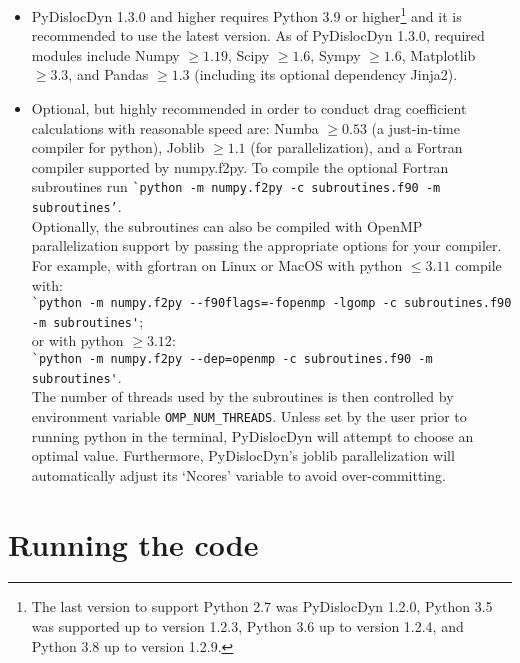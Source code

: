 \documentclass[11pt,letterpaper,oneside,pdftex]{article}
\begin{document}
\begin{itemize}
\item PyDislocDyn 1.3.0 and higher requires Python 3.9 or higher\footnote{
The last version to support Python 2.7 was PyDislocDyn 1.2.0, Python 3.5 was supported up to version 1.2.3, Python 3.6 up to version 1.2.4, and Python 3.8 up to version 1.2.9.}
and it is recommended to use the latest version.
As of PyDislocDyn 1.3.0, required modules include Numpy $\ge1.19$, Scipy $\ge1.6$, Sympy $\ge1.6$, Matplotlib $\ge3.3$, and Pandas $\ge1.3$ (including its optional dependency Jinja2).
\item Optional, but highly recommended in order to conduct drag coefficient calculations with reasonable speed are:
Numba $\ge0.53$ (a just-in-time compiler for python), Joblib $\ge1.1$ (for parallelization), and a Fortran compiler supported by numpy.f2py. To compile the optional Fortran subroutines run \verb|`python -m numpy.f2py -c subroutines.f90 -m subroutines’|.\\
Optionally, the subroutines can also be compiled with OpenMP parallelization support by passing the appropriate options for your compiler. For example, with gfortran on Linux or MacOS with python $\leq3.11$ compile with:
\\\verb|`python -m numpy.f2py --f90flags=-fopenmp -lgomp -c subroutines.f90|\\\verb|-m subroutines'|;\\
or with python $\geq3.12$:
\\\verb|`python -m numpy.f2py --dep=openmp -c subroutines.f90 -m subroutines'|.\\
The number of threads used by the subroutines is then controlled by environment variable \verb|OMP_NUM_THREADS|.
Unless set by the user prior to running python in the terminal, PyDislocDyn will attempt to choose an optimal value.
Furthermore, PyDislocDyn’s joblib parallelization will automatically adjust its ‘Ncores’ variable to avoid over-committing.
\end{itemize}


\section{Running the code}
\end{document}

